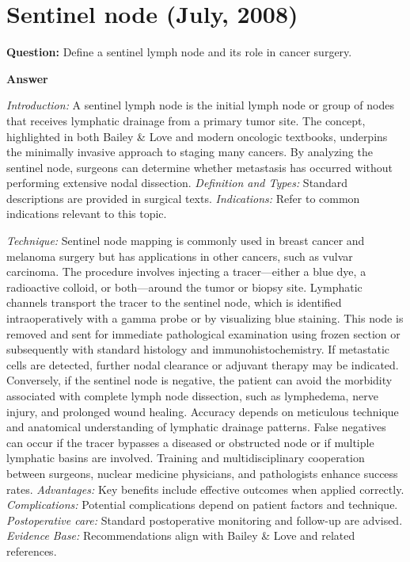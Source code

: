 \documentclass{article}
\begin{document}
\section{Sentinel node (July, 2008)}

\textbf{Question:} Define a sentinel lymph node and its role in cancer surgery.

\textbf{Answer}

\emph{Introduction:} A sentinel lymph node is the initial lymph node or group of nodes that receives lymphatic drainage from a primary tumor site. The concept, highlighted in both Bailey & Love and modern oncologic textbooks, underpins the minimally invasive approach to staging many cancers. By analyzing the sentinel node, surgeons can determine whether metastasis has occurred without performing extensive nodal dissection.
\emph{Definition and Types:} Standard descriptions are provided in surgical texts.
\emph{Indications:} Refer to common indications relevant to this topic.

\emph{Technique:} Sentinel node mapping is commonly used in breast cancer and melanoma surgery but has applications in other cancers, such as vulvar carcinoma. The procedure involves injecting a tracer—either a blue dye, a radioactive colloid, or both—around the tumor or biopsy site. Lymphatic channels transport the tracer to the sentinel node, which is identified intraoperatively with a gamma probe or by visualizing blue staining. This node is removed and sent for immediate pathological examination using frozen section or subsequently with standard histology and immunohistochemistry. If metastatic cells are detected, further nodal clearance or adjuvant therapy may be indicated. Conversely, if the sentinel node is negative, the patient can avoid the morbidity associated with complete lymph node dissection, such as lymphedema, nerve injury, and prolonged wound healing. Accuracy depends on meticulous technique and anatomical understanding of lymphatic drainage patterns. False negatives can occur if the tracer bypasses a diseased or obstructed node or if multiple lymphatic basins are involved. Training and multidisciplinary cooperation between surgeons, nuclear medicine physicians, and pathologists enhance success rates.
\emph{Advantages:} Key benefits include effective outcomes when applied correctly.
\emph{Complications:} Potential complications depend on patient factors and technique.
\emph{Postoperative care:} Standard postoperative monitoring and follow-up are advised.
\emph{Evidence Base:} Recommendations align with Bailey & Love and related references.
\end{document}
